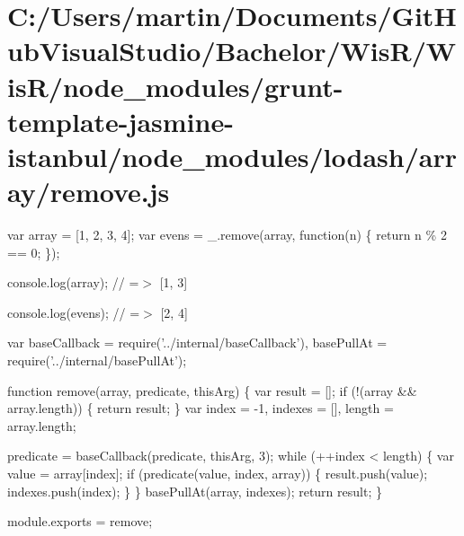 \hypertarget{_c_1_2_users_2martin_2_documents_2_git_hub_visual_studio_2_bachelor_2_wis_r_2_wis_r_2node_module9ab9d70b7baf8861a4af378bca096a97}{}\section{C\+:/\+Users/martin/\+Documents/\+Git\+Hub\+Visual\+Studio/\+Bachelor/\+Wis\+R/\+Wis\+R/node\+\_\+modules/grunt-\/template-\/jasmine-\/istanbul/node\+\_\+modules/lodash/array/remove.\+js}
var array = \mbox{[}1, 2, 3, 4\mbox{]}; var evens = \+\_\+.\+remove(array, function(n) \{ return n \% 2 == 0; \});

console.\+log(array); // =$>$ \mbox{[}1, 3\mbox{]}

console.\+log(evens); // =$>$ \mbox{[}2, 4\mbox{]}


\begin{DoxyCodeInclude}
var baseCallback = require(\textcolor{stringliteral}{'../internal/baseCallback'}),
    basePullAt = require(\textcolor{stringliteral}{'../internal/basePullAt'});

\textcolor{keyword}{function} \textcolor{keyword}{remove}(array, predicate, thisArg) \{
  var result = [];
  \textcolor{keywordflow}{if} (!(array && array.length)) \{
    \textcolor{keywordflow}{return} result;
  \}
  var index = -1,
      indexes = [],
      length = array.length;

  predicate = baseCallback(predicate, thisArg, 3);
  \textcolor{keywordflow}{while} (++index < length) \{
    var value = array[index];
    \textcolor{keywordflow}{if} (predicate(value, index, array)) \{
      result.push(value);
      indexes.push(index);
    \}
  \}
  basePullAt(array, indexes);
  \textcolor{keywordflow}{return} result;
\}

module.exports = \textcolor{keyword}{remove};
\end{DoxyCodeInclude}
 